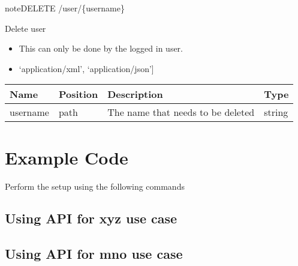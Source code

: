 \documentclass[letterpaper,10pt,english]{sphinxmanual}
\begin{document}
\begin{sphinxadmonition}{note}{DELETE /user/\{username\}}

Delete user\begin{itemize}
\item {} 
This can only be done by the logged in user.

\item {} 
\sphinxstylestrong{Produces: 
}{[}‘application/xml’, ‘application/json’{]}

\end{itemize}




\begin{savenotes}\sphinxattablestart
\centering
\begin{tabulary}{\linewidth}[t]{|T|T|T|T|}
\hline
\sphinxstyletheadfamily 
Name
&\sphinxstyletheadfamily 
Position
&\sphinxstyletheadfamily 
Description
&\sphinxstyletheadfamily 
Type
\\
\hline
username
&
path
&
The name that needs to be deleted
&
string
\\
\hline
\end{tabulary}
\par
\sphinxattableend\end{savenotes}



\end{sphinxadmonition}


\chapter{Example Code}
\label{\detokenize{dev-guide:example-code}}
Perform the setup using the following commands

\begin{sphinxVerbatim}[commandchars=\\\{\}]
       
\end{sphinxVerbatim}


\section{Using API for xyz use case}
\label{\detokenize{dev-guide:using-api-for-xyz-use-case}}

\section{Using API for mno use case}
\label{\detokenize{dev-guide:using-api-for-mno-use-case}}


\renewcommand{\indexname}{Index}
\printindex
\end{document}
